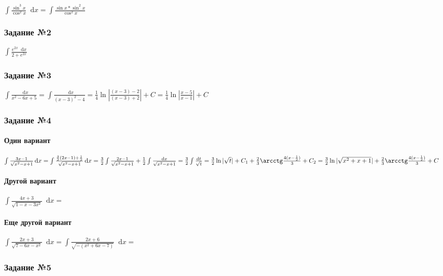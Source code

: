 \documentclass{article}
\newcommand*\diff{\mathop{}\!\mathrm{d}}
\begin{document}
$\int \frac{\sin^3 x}{\cos^2 x} \diff x = \int \frac{\sin x * \sin^2 x}{\cos^2 x}$

\subsubsection{Задание №2}

$\int \frac{e^{2 x} \diff x}{2 + e^{2 x}}$

\subsubsection{Задание №3}

$
\int \frac{\diff x}{x^2 - 6x + 5} = \int \frac{\diff x}{(x - 3)^2 - 4}
= \frac{1}{4} \ln | \frac{(x - 3) - 2}{(x - 3) + 2} | + C = \frac{1}{4} \ln | \frac{x - 5}{x - 1} | + C
$


\subsubsection{Задание №4}

\paragraph{Один вариант}

$
\int \frac{3x - 1}{\sqrt{x^2 - x + 1}} \diff x
= \int \frac{\frac{3}{2} (2 x - 1) + \frac{1}{2}}{\sqrt{x^2 - x + 1}} \diff x
= \frac{3}{2} \int \frac{2x - 1}{\sqrt{x^2 - x + 1}} + \frac{1}{2} \int \frac{\diff x}{\sqrt{x^2 - x + 1}}
= \frac{3}{2} \int \frac{\diff t}{\sqrt{t}}
= \frac{3}{2} \ln |\sqrt{t}| + C_1  + \frac{2}{3} \arcctg \frac{4(x - \frac{1}{2})}{3} + C_2
= \frac{3}{2} \ln |\sqrt{x^2 + x + 1}|  + \frac{2}{3} \arcctg \frac{4(x - \frac{1}{2})}{3} + C
$

\paragraph{Другой вариант}

$\int \frac{4 x + 3}{\sqrt{1 - x - 3x^2}} \diff x = $

\paragraph{Еще другой вариант}

$\int \frac{2 x + 3}{\sqrt{7 - 6x - x^2}} \diff x = \int \frac{2 x + 6}{\sqrt{-(x^2 + 6x - 7)}} \diff x = $

\subsubsection{Задание №5}
\end{document}
